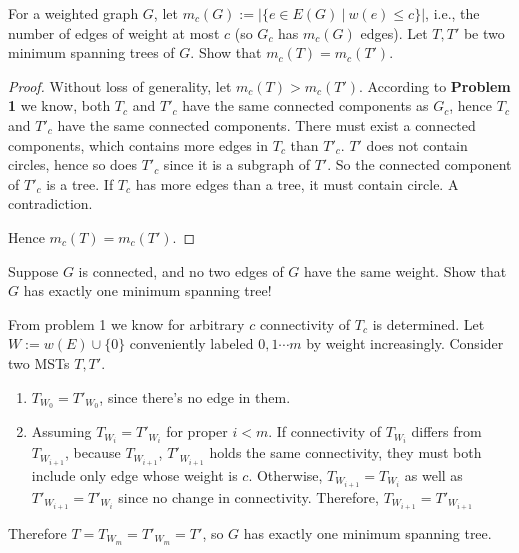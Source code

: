 \documentclass[11pt,a4paper,oneside]{article}
\begin{document}
\begin{problem}{2}
	\statement
	For a weighted graph $G$, let $m_c(G) := | \{ e \in E(G) \ | \ w(e) \leq c\}|$, i.e.,
	the number of edges of weight at most $c$ (so $G_c$ has $m_c(G)$ edges).
	Let $T, T'$ be two minimum spanning trees of $G$. Show that
	$m_c(T) = m_c(T')$.

	\solution
	\begin{proof}
	Without loss of generality, let \(m_c(T) > m_c(T')\). According to \textbf{Problem 1} we know, both \(T_c\) and \(T'_c\) have the same connected components as \(G_c\), hence \(T_c\) and \(T'_c\) have the same connected components. There must exist a connected components, which contains more edges in \(T_c\) than \(T'_c\). \(T'\) does not contain circles, hence so does \(T'_c\) since it is a subgraph of \(T'\). So the connected component of \(T'_c\) is a tree. If \(T_c\) has more edges than a tree, it must contain circle. A contradiction.
	
	Hence \(m_c(T) = m_c(T')\).
	\end{proof}
\end{problem}
\begin{problem}{3}
	\statement
	Suppose $G$ is connected, and no two edges of $G$ have the same weight. 
	Show that $G$ has exactly one minimum spanning tree!
	
	\solution  

	From problem 1 we know for arbitrary $c$ connectivity of $T_c$ is determined.
	Let $W := w(E) \cup \{0\}$ conveniently labeled $0, 1  \cdots m$ by weight increasingly. Consider two MSTs $T, T'$.
	\begin{enumerate}
		\item $T_{W_0} = T'_{W_0}$, since there's no edge in them.
		\item Assuming $T_{W_i} = T'_{W_i}$ for proper $i < m$. If connectivity of $T_{W_i}$ differs from $T_{W_{i + 1}}$, because $T_{W_{i+1}}$, $T'_{W_{i + 1}}$ holds the same connectivity, they must both include only edge whose weight is $c$. Otherwise, $T_{W_{i+1}} = T_{W_{i}}$ as well as $T'_{W_{i+1}} = T'_{W_{i}}$ since no change in connectivity. Therefore, $T_{W_{i + 1}} = T'_{W_{i + 1}}$
	\end{enumerate} 

	Therefore $T = T_{W_m} = T'_{W_m} = T'$, so \(G\) has exactly one minimum spanning tree.
\end{problem}
\end{document}
